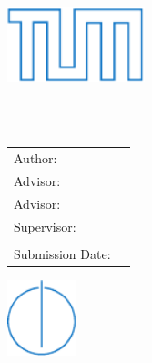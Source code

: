 \begin{titlepage}
  \centering

  \vspace{40mm}
  \includegraphics[width=40mm]{logos/tum} 

  \vspace{10mm}
  {\huge\MakeUppercase{\getFaculty{}}}\\

  \vspace{5mm}
  {\large\MakeUppercase{\getUniversity{}}}\\

  \vspace{20mm}
  {\Large \getDoctype{}}

  \vspace{15mm}
  {\huge\bfseries \getTitle{}}


  \vspace{15mm}
  \begin{tabular}{l l}
    Author: & \getAuthor{} \\
    Advisor: & \getAdvisorOne{} \\
    Advisor: & \getAdvisorTwo{} \\
    Supervisor: & \getSupervisor{} \\ \\
    Submission Date: & \getSubmissionDate{} \\
  \end{tabular}

  \vspace{20mm}
  \includegraphics[width=20mm]{logos/faculty}
\end{titlepage}
